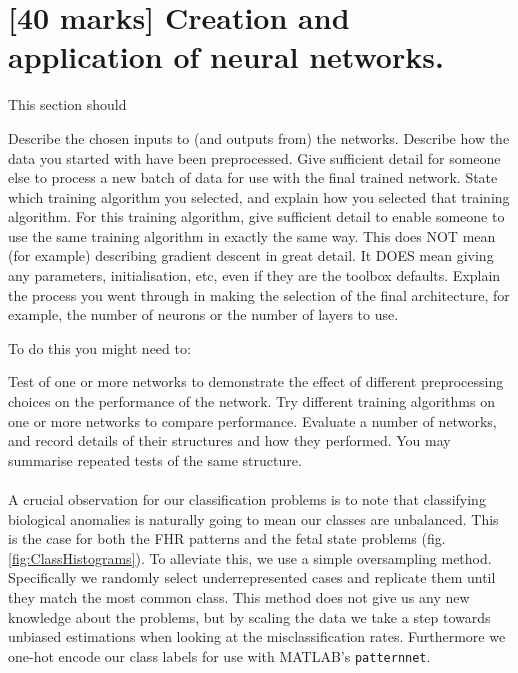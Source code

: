 \documentclass[11pt,a4paper]{article}
\begin{document}
\section{[40 marks] Creation and application of neural networks.}
\label{sec:creation}
This section should
\begin{outline}
  \1 Describe the chosen inputs to (and outputs from) the networks.
  \1 Describe how the data you started with have been preprocessed.
  \1 Give sufficient detail for someone else to process a new batch of data for use with the final trained network.
  \1 State which training algorithm you selected, and explain how you selected that training algorithm. For this training algorithm, give sufficient detail to enable someone to use the same training algorithm in exactly the same way. This does NOT mean (for example) describing gradient descent in great detail. It DOES mean giving any parameters, initialisation, etc, even if they are the toolbox defaults.
  \1 Explain the process you went through in making the selection of the final architecture, for example, the number of neurons or the number of layers to use.
\end{outline}

To do this you might need to:
\begin{outline}
  \1 Test of one or more networks to demonstrate the effect of different preprocessing choices on the performance of the network.
  \1 Try different training algorithms on one or more networks to compare performance.
  \1 Evaluate a number of networks, and record details of their structures and how they performed. You may summarise repeated tests of the same structure. 
\end{outline}
\paragraph{}
A crucial observation for our classification problems is to note that classifying biological anomalies is naturally going to mean our classes are unbalanced. This is the case for both the FHR patterns and the fetal state problems (fig. \ref{fig:ClassHistograms}). To alleviate this, we use a simple oversampling method. Specifically we randomly select underrepresented cases and replicate them until they match the most common class. This method does not give us any new knowledge about the problems, but by scaling the data we take a step towards unbiased estimations when looking at the misclassification rates. Furthermore we one-hot encode our class labels for use with MATLAB's \texttt{patternnet}.
\end{document}
